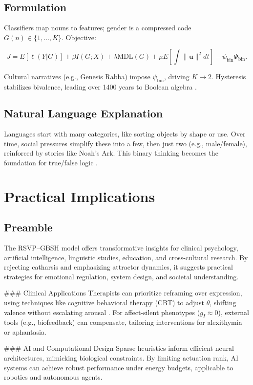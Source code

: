 \documentclass[11pt]{article}
\theoremstyle{plain}
\begin{document}
\subsection{Formulation}
Classifiers map nouns to features; gender is a compressed code \(G(n) \in \{1, \dots, K\}\). Objective:

\[
J = E[\ell(Y|G)] + \beta I(G; X) + \lambda \text{MDL}(G) + \mu E[\int \|\mathbf{u}\|^2 dt] - \psi_{\text{bin}} \Phi_{\text{bin}}.
\]

Cultural narratives (e.g., Genesis Rabba) impose \(\psi_{\text{bin}}\), driving \(K \to 2\). Hysteresis stabilizes bivalence, leading over 1400 years to Boolean algebra \citep{GenesisRabbah400, Boole1854}.

\subsection{Natural Language Explanation}
Languages start with many categories, like sorting objects by shape or use. Over time, social pressures simplify these into a few, then just two (e.g., male/female), reinforced by stories like Noah’s Ark. This binary thinking becomes the foundation for true/false logic \citep{Kneale1962}.

\section{Practical Implications}

\subsection{Preamble}
The RSVP–GBSH model offers transformative insights for clinical psychology, artificial intelligence, linguistic studies, education, and cross-cultural research. By rejecting catharsis and emphasizing attractor dynamics, it suggests practical strategies for emotional regulation, system design, and societal understanding.

### Clinical Applications
Therapists can prioritize reframing over expression, using techniques like cognitive behavioral therapy (CBT) to adjust \(\theta\), shifting valence without escalating arousal \citep{Douglas1966}. For affect-silent phenotypes (\(g_I \approx 0\)), external tools (e.g., biofeedback) can compensate, tailoring interventions for alexithymia or aphantasia.

### AI and Computational Design
Sparse heuristics inform efficient neural architectures, mimicking biological constraints. By limiting actuation rank, AI systems can achieve robust performance under energy budgets, applicable to robotics and autonomous agents.
\end{document}
